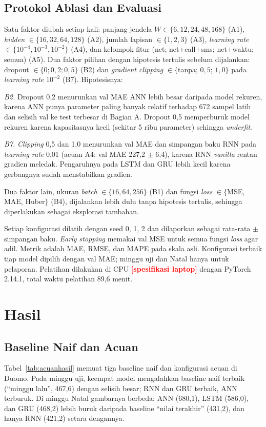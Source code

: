 \documentclass[conference,a4paper]{IEEEtran}
\newcommand{\isi}[1]{\textcolor{red}{\textbf{[#1]}}}
\begin{document}
\subsection{Protokol Ablasi dan Evaluasi}
Satu faktor diubah setiap kali: panjang jendela $W \in \{6, 12, 24, 48, 168\}$ (A1), \textit{hidden} $\in \{16, 32, 64, 128\}$ (A2), jumlah lapisan $\in \{1, 2, 3\}$ (A3), \textit{learning rate} $\in \{10^{-4}, 10^{-3}, 10^{-2}\}$ (A4), dan kelompok fitur (net; net+call+sms; net+waktu; semua) (A5). Dua faktor pilihan dengan hipotesis tertulis sebelum dijalankan: dropout $\in \{0; 0{,}2; 0{,}5\}$ (B2) dan \textit{gradient clipping} $\in \{$tanpa; $0{,}5$; $1{,}0\}$ pada \textit{learning rate} $10^{-2}$ (B7). Hipotesisnya:

\emph{B2.} Dropout 0,2 menurunkan val MAE ANN lebih besar daripada model rekuren, karena ANN punya parameter paling banyak relatif terhadap 672 sampel latih dan selisih val ke test terbesar di Bagian A. Dropout 0,5 memperburuk model rekuren karena kapasitasnya kecil (sekitar 5 ribu parameter) sehingga \textit{underfit}.

\emph{B7.} \textit{Clipping} 0,5 dan 1,0 menurunkan val MAE dan simpangan baku RNN pada \textit{learning rate} 0,01 (acuan A4: val MAE 227,2 $\pm$ 6,4), karena RNN \textit{vanilla} rentan gradien meledak. Pengaruhnya pada LSTM dan GRU lebih kecil karena gerbangnya sudah menstabilkan gradien.

Dua faktor lain, ukuran \textit{batch} $\in \{16, 64, 256\}$ (B1) dan fungsi \textit{loss} $\in \{$MSE, MAE, Huber$\}$ (B4), dijalankan lebih dulu tanpa hipotesis tertulis, sehingga diperlakukan sebagai eksplorasi tambahan.

Setiap konfigurasi dilatih dengan seed 0, 1, 2 dan dilaporkan sebagai rata-rata $\pm$ simpangan baku. \textit{Early stopping} memakai val MSE untuk semua fungsi \textit{loss} agar adil. Metrik adalah MAE, RMSE, dan MAPE pada skala asli. Konfigurasi terbaik tiap model dipilih dengan val MAE; minggu uji dan Natal hanya untuk pelaporan. Pelatihan dilakukan di CPU \isi{spesifikasi laptop} dengan PyTorch 2.14.1, total waktu pelatihan 89,6 menit.

\section{Hasil}

\subsection{Baseline Naif dan Acuan}
Tabel~\ref{tab:acuanhasil} memuat tiga baseline naif dan konfigurasi acuan di Duomo. Pada minggu uji, keempat model mengalahkan baseline naif terbaik (``minggu lalu'', 467,6) dengan selisih besar; RNN dan GRU terbaik, ANN terburuk. Di minggu Natal gambarnya berbeda: ANN (680,1), LSTM (586,0), dan GRU (468,2) lebih buruk daripada baseline ``nilai terakhir'' (431,2), dan hanya RNN (421,2) setara dengannya.
\end{document}
